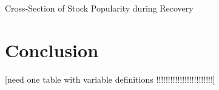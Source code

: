 \documentclass[12pt]{article}
\numberwithin{equation}{section} %
\begin{document}
\begin{table}[H]
\caption{Cross-Section of Stock Popularity during Recovery}
 \label{recoveryreg}
\end{table}


\section{Conclusion}


% 
%
 
 
 \newpage


 
 [need one table with variable definitions !!!!!!!!!!!!!!!!!!!!!!!!]
 
\end{document}
